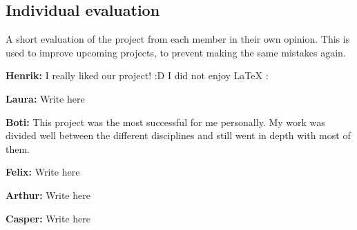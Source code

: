 \documentclass[../report.tex]{subfiles}
\begin{document}
\subsection{Individual evaluation}
A short evaluation of the project from each member in their own opinion. This is used to improve
upcoming projects, to prevent making the same mistakes again.

\textbf{Henrik:}
I really liked our project! :D I did not enjoy LaTeX :%

\textbf{Laura:}
Write here

\textbf{Boti:}
This project was the most successful for me personally. My work was divided well between the different disciplines
and still went in depth with most of them.

\textbf{Felix:}
Write here

\textbf{Arthur:}
Write here

\textbf{Casper:}
Write here
\end{document}
